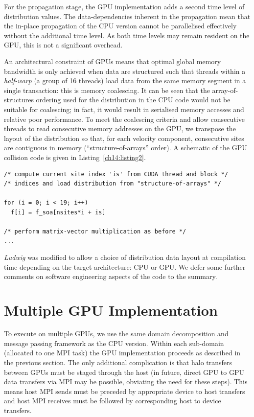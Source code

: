 For the propagation stage, the GPU implementation adds a second time
level of distribution values. The data-dependencies inherent in the
propagation mean that the in-place propagation of the CPU version
cannot be parallelised effectively without the additional time level.
As both time levels may remain resident on the GPU, this is not a
significant overhead.

An architectural
constraint of GPUs means that optimal global memory bandwidth
is only achieved when data are structured such that threads within a
{\it half-warp} (a group of 16 threads) load data from the same memory
segment in a single transaction: this is memory coalescing. It can be
seen that the array-of-structures ordering used for the distribution
in the CPU code would not be suitable for coalescing; in fact, it would
result in serialised memory accesses and relative poor performance.
To meet the coalescing criteria and allow consecutive threads to read
consecutive memory addresses on the GPU, we transpose the layout of the
distribution so that, for each velocity component, consecutive sites
are contiguous in memory (``structure-of-arrays'' order). A schematic of
the GPU collision code is given in Listing~\ref{ch14:listing2}.

\begin{lstlisting}[float, label=ch14:listing2,
caption = Collision schematic for GPU.]
/* compute current site index 'is' from CUDA thread and block */
/* indices and load distribution from "structure-of-arrays" */

for (i = 0; i < 19; i++)    
  f[i] = f_soa[nsites*i + is]

/* perform matrix-vector multiplication as before */
...
\end{lstlisting}


\textit{Ludwig} was modified to allow a choice of distribution data layout
at compilation time depending on the target architecture: CPU or GPU. We
defer some further comments on software engineering aspects of the code to
the summary.


\section{Multiple GPU Implementation}\label{ch14:sec:parallelgpu}

To execute on multiple GPUs, we use the same domain decomposition
and message passing framework as the CPU version. Within each
sub-domain (allocated to one MPI task) the GPU implementation
proceeds as described in the previous section. The only additional
complication is that halo transfers between GPUs must be staged
through the host (in future, direct GPU to GPU data transfers via
MPI may be possible, obviating the need for these steps). This
means host MPI sends must be preceded by appropriate device to host
transfers and host MPI receives must be followed by corresponding host
to device transfers.

